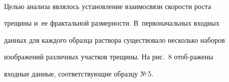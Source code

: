 \pagebreak





\





\vspace*{-12pt}






















   


   Целью анализа являлось установление взаимосвязи скорости роста 


трещины и~ее фрактальной размерности. В~первоначальных входных 


данных для каждого образца раствора существовало несколько наборов 


изображений различных участков трещины. На рис.~8 отоб-\linebreak ра\-же\-ны 


входные данные, соответствующие образцу №\,5.


   


    





